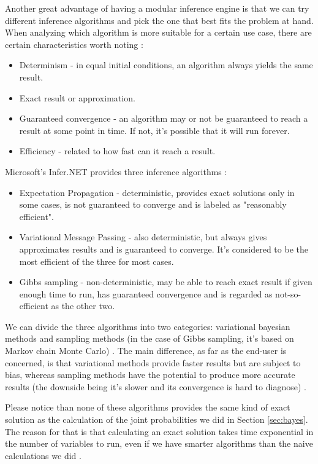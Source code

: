 Another great advantage of having a modular inference engine is that we can
try different inference algorithms and pick the one that best fits the problem
at hand. When analyzing which algorithm is more suitable for a certain use case, there are certain
characteristics worth noting \cite{Minka1999}:

\begin{itemize}
  \item Determinism - in equal initial conditions, an algorithm always yields
the same result.
  \item Exact result or approximation.
  \item Guaranteed convergence - an algorithm may or not be guaranteed to reach
a result at some point in time. If not, it's possible that it will run forever.
  \item Efficiency - related to how fast can it reach a result.
\end{itemize}

Microsoft's Infer.NET provides three inference algorithms \cite{msalg}:

\begin{itemize}
  \item Expectation Propagation - deterministic, provides exact solutions only
in some cases, is not guaranteed to converge and is labeled as "reasonably
efficient".
  \item Variational Message Passing - also deterministic, but always gives
approximates results and is guaranteed to converge. It's considered to be the
most efficient of the three for most cases.
  \item Gibbs sampling - non-deterministic, may be able to reach exact result
if given enough time to run, has guaranteed convergence and is regarded as
not-so-efficient as the other two.
\end{itemize}

We can divide the three algorithms into two categories: variational bayesian
methods \cite{Winn2005}\cite{Minka1999} and sampling methods (in the case of Gibbs
sampling, it's based on Markov chain Monte Carlo) \cite{Andrieu2003}. The main
difference, as far as the end-user is concerned, is that variational methods
provide faster results but are subject to bias, whereas sampling methods have
the potential to produce more accurate results (the downside being it's slower
and its convergence is hard to diagnose) \cite{Shen2010}.

Please notice than none of these algorithms provides the same kind of exact
solution as the calculation of the joint probabilities we did in Section
\ref{sec:bayes}. The reason for that is that calculating an exact solution
takes time exponential in the number of variables to run, even if we have smarter
algorithms than the naive calculations we did \cite{Zhang1994}.

